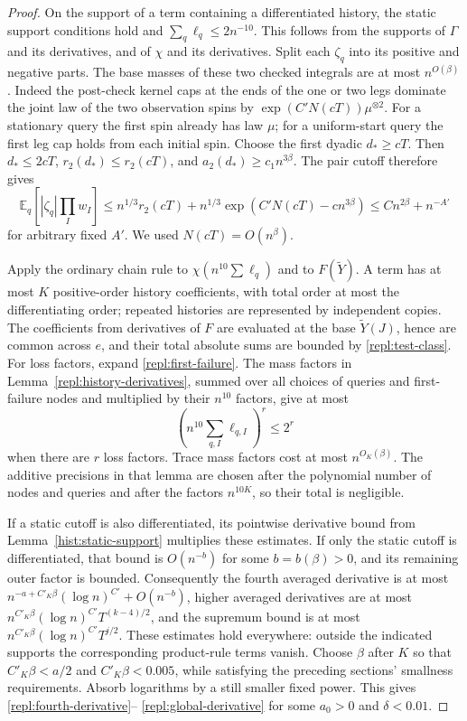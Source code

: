 \begin{proof}
On the support of a term containing a differentiated history, the static
support conditions hold and
$\sum_q\ell_q\le2n^{-10}$.  This follows from the supports of $\Gamma$
and its derivatives, and of $\chi$ and its derivatives.  Split each
$\zeta_q$ into its positive and negative parts.  The base masses of these two
checked integrals are at most $n^{O(\beta)}$.  Indeed the post-check kernel
caps at the ends of the one or two legs dominate the joint law of the two observation spins
by
$\exp(C'N(cT))\mu^{\otimes2}$.  For a stationary query the first spin
already has law $\mu$; for a uniform-start query the first leg cap holds
from each initial spin.  Choose the first dyadic $d_*\ge cT$.  Then
$d_*\le2cT$, $r_2(d_*)\le r_2(cT)$, and $a_2(d_*)\ge c_1n^{3\beta}$.
The pair cutoff therefore gives
\[
 \mathbb E_q\left[|\zeta_q|\prod_Iw_I\right]
 \le n^{1/3}r_2(cT)
     +n^{1/3}\exp(C'N(cT)-c n^{3\beta})
 \le C n^{2\beta}+n^{-A'}
\]
for arbitrary fixed $A'$.  We used $N(cT)=O(n^\beta)$.

Apply the ordinary chain rule to $\chi(n^{10}\sum\ell_q)$ and to
$F(\widetilde Y)$.  A term has at most $K$ positive-order history
coefficients, with total order at most the differentiating order; repeated
histories are represented by independent copies.  The coefficients from
derivatives of $F$ are evaluated at the base $\widetilde Y(J)$, hence are
common across $e$, and their total absolute sums are bounded by
\eqref{repl:test-class}.  For loss factors, expand
\eqref{repl:first-failure}.  The mass factors in
Lemma~\ref{repl:history-derivatives}, summed over all choices of queries and
first-failure nodes and multiplied by their $n^{10}$ factors, give at most
\[
 \left(n^{10}\sum_{q,I}\ell_{q,I}\right)^r\le2^r
\]
when there are $r$ loss factors.  Trace mass factors cost at most
$n^{O_K(\beta)}$.  The additive precisions in that lemma are chosen after
the polynomial number of nodes and queries and after the factors
$n^{10K}$, so their total is negligible.

If a static cutoff is also differentiated, its pointwise derivative bound
from Lemma~\ref{hist:static-support} multiplies these estimates.  If only the
static cutoff is differentiated, that bound is $O(n^{-b})$ for some
$b=b(\beta)>0$, and its remaining outer factor is bounded.  Consequently
the fourth averaged derivative is at most
$n^{-a+C'_K\beta}(\log n)^{C'}+O(n^{-b})$, higher averaged derivatives
are at most $n^{C'_K\beta}(\log n)^{C'}T^{(k-4)/2}$, and the supremum
bound is at most $n^{C'_K\beta}(\log n)^{C'}T^{j/2}$.
These estimates hold everywhere: outside the indicated supports the
corresponding product-rule terms vanish.  Choose $\beta$ after $K$ so
that $C'_K\beta<a/2$ and $C'_K\beta<0.005$, while satisfying the preceding
sections' smallness requirements.  Absorb logarithms by a still smaller
fixed power.  This gives \eqref{repl:fourth-derivative}--%
\eqref{repl:global-derivative} for some $a_0>0$ and $\delta<0.01$.
\end{proof}

